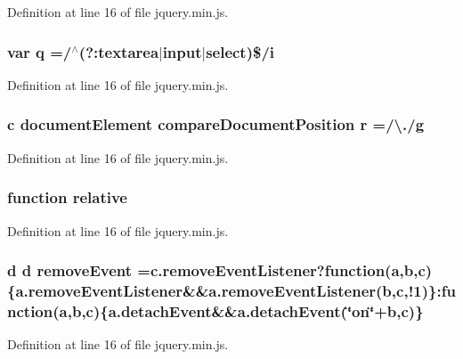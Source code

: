 Definition at line 16 of file jquery.\-min.\-js.

\subsubsection[{q}]{\setlength{\rightskip}{0pt plus 5cm}var q =/$^\wedge$(?\-:textarea$|$input$|$select)\$/{\bf i}}\label{jquery_8min_8js_aee3046c01d22ccd1efcb944608aec125}


Definition at line 16 of file jquery.\-min.\-js.

\subsubsection[{r}]{\setlength{\rightskip}{0pt plus 5cm}c document\-Element compare\-Document\-Position r =/\textbackslash{}./{\bf g}}\label{jquery_8min_8js_a015987921e6b4b0bb09bde6fd362ced7}


Definition at line 16 of file jquery.\-min.\-js.

\subsubsection[{relative}]{\setlength{\rightskip}{0pt plus 5cm}function relative}\label{jquery_8min_8js_ae0c0e5308d2767d1154ef1b765fc28c9}


Definition at line 16 of file jquery.\-min.\-js.

\subsubsection[{remove\-Event}]{\setlength{\rightskip}{0pt plus 5cm}d d remove\-Event =c.\-remove\-Event\-Listener?function({\bf a},{\bf b},c)\{a.\-remove\-Event\-Listener\&\&a.\-remove\-Event\-Listener({\bf b},c,!1)\}\-:function({\bf a},{\bf b},c)\{a.\-detach\-Event\&\&a.\-detach\-Event(\char`\"{}on\char`\"{}+b,c)\}}\label{jquery_8min_8js_a6e2b056aad7399842ab001946dde6990}


Definition at line 16 of file jquery.\-min.\-js.

